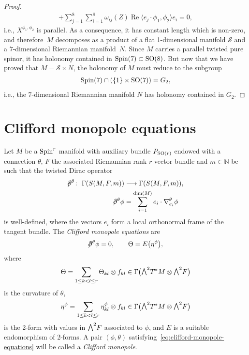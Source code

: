\documentclass[pdftex]{sigma}
\newcommand{\ext}{\raise1pt\hbox{\small$\bigwedge$}}
\newcommand{\dirac}{/\kern-5pt\partial}
\newcommand{\lra}{\longrightarrow}
\numberwithin{equation}{section}
\begin{document}
\begin{proof}
\begin{gather*}
 + \sum_{j=1}^8 \sum_{i=1}^8\omega_{ij}(Z)\operatorname{Re}\langle e_j\cdot \phi_1,\phi_2\rangle e_i
 = 0,
\end{gather*}
i.e., $X^{\phi_1,\phi_2}$ is parallel. As a consequence, it has constant length which is non-zero, and therefore~$M$ decomposes as a product of a flat 1-dimensional manifold $\mathcal{S}$ and a $7$-dimensional Riemannian manifold~$N$. Since $M$ carries a parallel twisted pure spinor, it has holonomy contained in ${\rm Spin}(7)\subset {\rm SO}(8)$. But now that we have proved that $M=\mathcal{S}\times N$, the holonomy of $M$ must reduce to the subgroup
\begin{gather*}{\rm Spin}(7)\cap (\{1\}\times {\rm SO}(7)) =G_2, \end{gather*}
i.e., the $7$-dimensional Riemannian manifold $N$ has holonomy contained in $G_2$.
\end{proof}

\section{Clifford monopole equations}\label{sec:Clifford-monopoles}

Let $M$ be a ${\rm Spin}^r$ manifold with auxiliary bundle $P_{{\rm SO}(r)}$ endowed with a connection $\theta$, $F$ the associated Riemannian rank $r$ vector bundle and $m\in\mathbb{N}$ be such that the twisted Dirac operator
\begin{align*}
\dirac^\theta\colon \ \Gamma(S(M,F,m))&\lra \Gamma(S(M,F,m)),\\
\dirac^\theta\phi &= \sum_{i=1}^{\dim(M)} e_i\cdot \nabla_{e_i}^\theta \phi
\end{align*}
is well-defined, where the vectors $e_i$ form a local orthonormal frame of the tangent bundle. The {\em Clifford monopole equations} are
\begin{gather}
 \dirac^\theta\phi = 0,\qquad \Theta = E\big(\eta^\phi\big),\label{eq:clifford-monopole-equations}
\end{gather}
where
\begin{gather*}
 \Theta = \sum_{1\leq k<l \leq r} \Theta_{kl}\otimes f_{kl} \in \Gamma\big(\ext^2T^*M\otimes \ext^2F\big)
\end{gather*}
is the curvature of $\theta$,
\begin{gather*}
 \eta^\phi = \sum_{1\leq k<l \leq r} \eta_{kl}^\phi\otimes f_{kl} \in \Gamma\big(\ext^2T^*M\otimes \ext^2F\big)
\end{gather*}
is the 2-form with values in $\ext^2 F$ associated to $\phi$, and $E$ is a suitable endomorphism of 2-forms. A pair $(\phi,\theta)$ satisfying~\eqref{eq:clifford-monopole-equations} will be called a {\em Clifford monopole}.
\end{document}
